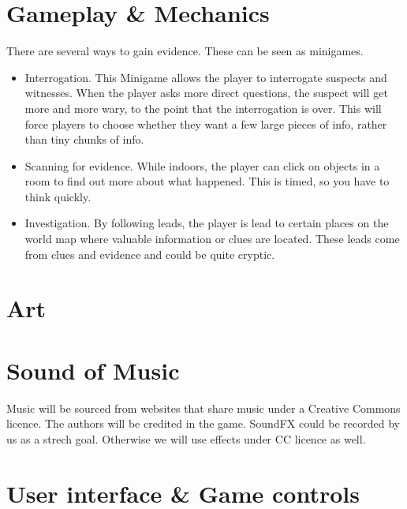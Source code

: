 \documentclass{article}
\begin{document}
\section{Gameplay \& Mechanics}
		There are several ways to gain evidence. These can be seen as minigames.
		\begin{itemize}
			\item Interrogation. 
			This Minigame allows the player to interrogate suspects and witnesses. When the player asks more direct questions, the suspect will get more and more wary, to the point that the interrogation is over. This will force players to choose whether they want a few large pieces of info, rather than tiny chunks of info.
			\item Scanning for evidence.
			While indoors, the player can click on objects in a room to find out more about what happened. This is timed, so you have to think quickly.
			\item Investigation. By following leads, the player is lead to certain places on the world map where valuable information or clues are located. These leads come from clues and evidence and could be quite cryptic.
		\end{itemize}
\newpage
\section{Art}
	

\section{Sound of Music}
			Music will be sourced from websites that share music under a Creative Commons licence. The authors will be credited in the game. SoundFX could be recorded by us as a strech goal. Otherwise we will use effects under CC licence as well.

\section{User interface \& Game controls}
\end{document}
